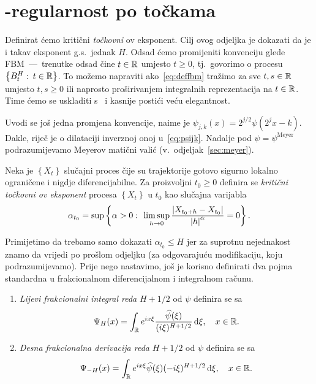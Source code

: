 \documentclass[main.tex]{subfiles}
\begin{document}
\nocite{*}

\section{\holder -regularnost po točkama}\label{sec:holpo}
Definirat ćemo kritični \emph{točkovni} \holder ov eksponent.
Cilj ovog odjeljka je dokazati da je i takav eksponent g.s.\ jednak \( H \). Odsad ćemo promijeniti konvenciju glede FBM~---~trenutke
odsad čine \( t \in \mathbb{R} \) umjesto \( t \ge 0 \), tj.\ govorimo
o procesu \( \left\{ B^H_t \, \colon \, t \in \mathbb{R} \right\} \).
To možemo napraviti ako~\eqref{eq:deffbm} tražimo
za sve \( t,s \in \mathbb{R} \) umjesto \( t,s \ge 0 \) ili
naprosto proširivanjem integralnih reprezentacija na \( t \in \mathbb{R} \).
Time ćemo se uskladiti s~\cite{ayache} i kasnije
postići veću elegantnost.

Uvodi se još jedna promjena konvencije, naime je \( \psi_{j,k}(x) = 2^{j/2}\psi(2^jx-k) \). Dakle, riječ je o dilataciji inverznoj onoj u~\eqref{eq:psijk}.
Nadalje pod \( \psi = \psi^{\mathrm{Meyer}}\) podrazumijevamo
Meyerov matični valić (v.~odjeljak~\ref{sec:meyer}).


\begin{definicija}\label{def:holpo}
	Neka je \( \left\{ X_t \right\} \) slučajni proces čije su trajektorije gotovo sigurno
	lokalno ograničene i nigdje diferencijabilne. Za proizvoljni
	\( t_0 \ge 0 \) definira se \emph{kritični točkovni \holder ov eksponent} procesa
	\( \left\{ X_t \right\} \) u \( t_0 \) kao slučajna varijabla
	\begin{equation}
		\alpha_{t_0} = \sup \left\{ \alpha > 0 \, \colon \,
		\limsup\limits_{h \rightarrow 0} \frac{\left| {X_{t_0+h}-X_{t_0}} \right|}{\left| {h} \right|^\alpha} = 0
		\right\}.
	\end{equation}
\end{definicija}

Primijetimo da trebamo samo dokazati \( \alpha_{t_0} \le H \)
jer za suprotnu nejednakost znamo da vrijedi po prošlom odjeljku (za odgovarajuću
modifikaciju, koju podrazumijevamo).
Prije nego nastavimo, još je korisno definirati dva pojma
standardna u frakcionalnom diferencijalnom i integralnom računu.

\begin{definicija}
	\begin{enumerate}
		\item \emph{Lijevi frakcionalni integral reda} \( H+1/2 \) od \( \psi \) definira se sa
		      \begin{equation}
			      \Psi_H(x) = \int_{\mathbb{R}} e^{ix\xi} \frac{\widehat{\psi}(\xi)}{(i\xi)^{H+1/2}} \,\mathrm d \xi, \quad x \in \mathbb{R}.
		      \end{equation}
		\item \emph{Desna frakcionalna derivacija reda} \( H+1/2 \) od \( \psi \) definira se sa
		      \begin{equation}
			      \Psi_{-H}(x)= \int_{\mathbb{R}} e^{ix\xi}\widehat{\psi}(\xi)(-i\xi)^{H+1/2} \,\mathrm d \xi, \quad x \in \mathbb{R}.
		      \end{equation}
	\end{enumerate}
\end{definicija}
\end{document}
